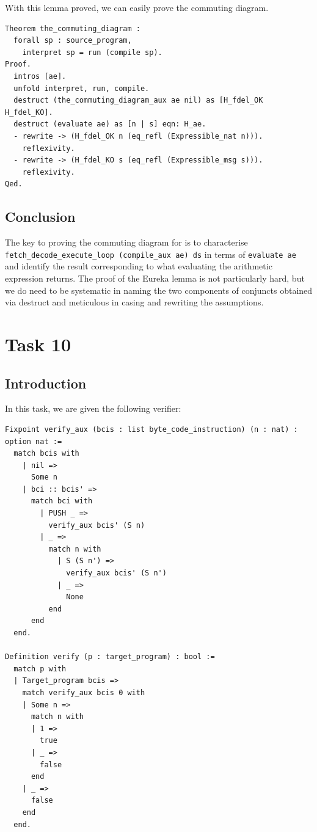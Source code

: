 \documentclass{article}
\begin{document}
With this lemma proved, we can easily prove the commuting diagram.
\begin{lstlisting}
Theorem the_commuting_diagram :
  forall sp : source_program,
    interpret sp = run (compile sp).
Proof.
  intros [ae].
  unfold interpret, run, compile.
  destruct (the_commuting_diagram_aux ae nil) as [H_fdel_OK H_fdel_KO].
  destruct (evaluate ae) as [n | s] eqn: H_ae.
  - rewrite -> (H_fdel_OK n (eq_refl (Expressible_nat n))).
    reflexivity.
  - rewrite -> (H_fdel_KO s (eq_refl (Expressible_msg s))).
    reflexivity.
Qed.
\end{lstlisting}

\subsection{Conclusion}
The key to proving the commuting diagram for is to characterise \texttt{fetch\_decode\_execute\_loop (compile\_aux ae) ds} in terms of \texttt{evaluate ae} and identify the result corresponding to what evaluating the arithmetic expression returns. The proof of the Eureka lemma is not particularly hard, but we do need to be systematic in naming the two components of conjuncts obtained via destruct and meticulous in casing and rewriting the assumptions.

\section{Task 10}

\subsection{Introduction}
In this task, we are given the following verifier:
\begin{lstlisting}
Fixpoint verify_aux (bcis : list byte_code_instruction) (n : nat) : option nat :=
  match bcis with
    | nil =>
      Some n
    | bci :: bcis' =>
      match bci with
        | PUSH _ =>
          verify_aux bcis' (S n)
        | _ =>
          match n with
            | S (S n') =>
              verify_aux bcis' (S n')
            | _ =>
              None
          end
      end
  end.

Definition verify (p : target_program) : bool :=
  match p with
  | Target_program bcis =>
    match verify_aux bcis 0 with
    | Some n =>
      match n with
      | 1 =>
        true
      | _ =>
        false
      end
    | _ =>
      false
    end
  end.
\end{lstlisting}
\end{document}

